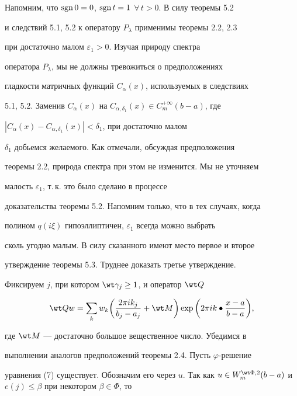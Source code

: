  


\begin{pf} 


Напомним, что $\operatorname{sgn} 0=0$, $\operatorname{sgn} t=1$ $\forall\,t>0$. В силу теоремы 5.2 


и следствий 5.1, 5.2 к оператору $P_\lambda$ применимы теоремы 2.2, 2.3 


при достаточно малом $\varepsilon_1>0$. Изучая природу спектра 


оператора $P_\lambda$, мы не должны тревожиться о предположениях 


гладкости матричных функций $C_\alpha(x)$, используемых в следствиях 


5.1, 5.2. Заменив $C_\alpha(x)$ на $C_{\alpha,\delta_1}(x)\in 


C^{+\infty}_m(b-a)$, где 


$|C_\alpha(x)-C_{\alpha,\delta_1}(x)|<\delta_1$, при достаточно малом 


$\delta_1$ добьемся желаемого. Как отмечали, обсуждая предположения 


теоремы 2.2, природа спектра при этом не изменится. Мы не уточняем 


малость $\varepsilon_1$, т.\,к. это было сделано в процессе 


доказательства теоремы 5.2. Напомним только, что в тех случаях, когда 


полином $q(i\xi)$ гипоэллиптичен, $\varepsilon_1$ всегда можно выбрать 


сколь угодно малым. В силу сказанного имеют место первое и второе 


утверждение теоремы 5.3. Труднее доказать третье утверждение. 


 


Фиксируем $j$, при котором $\wt\gamma_j\ge 1$, и оператор $\wt Q$ 


$$ 


\wt Q w=\sum_k w_k\bigg(\frac{2\pi i k_j}{b_j-a_j}+\wt M\bigg) 


\exp\bigg(2\pi i k\bullet\frac{x-a}{b-a}\bigg), 


$$ 


где $\wt M$ --- достаточно большое вещественное число. Убедимся в 


выполнении аналогов предположений теоремы 2.4. Пусть $\varphi$-решение 


уравнения (7) существует. Обозначим его через $u$. Так как $u\in 


W^{\wt\Phi,2}_m(b-a)$ и $e(j)\le\beta$ при некотором $\beta\in\Phi$, то 



\end{pf}
